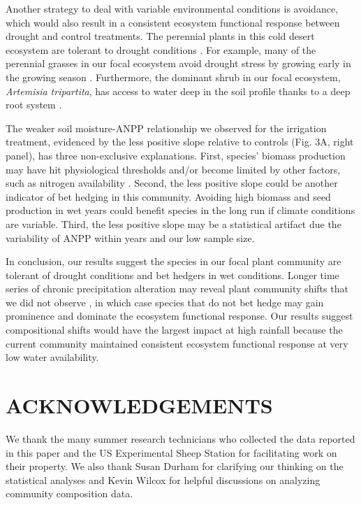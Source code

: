 \documentclass[fleqn,10pt,lineno]{wlpeerj} %
\begin{document}
Another strategy to deal with variable environmental conditions is
avoidance, which would also result in a consistent ecosystem functional
response between drought and control treatments. The perennial plants in
this cold desert ecosystem are tolerant to drought conditions
\citep[A.R. Kleinhesselink, unpublished data]{Bazzaz1979, Franks2011}.
For example, many of the perennial grasses in our focal ecosystem avoid
drought stress by growing early in the growing season \citep[A.R.
Kleinhesselink, personal observation]{Blaisdell1958}. Furthermore, the
dominant shrub in our focal ecosystem, \emph{Artemisia tripartita}, has
access to water deep in the soil profile thanks to a deep root system
\citep{Kulmatiski2017a}.

The weaker soil moisture-ANPP relationship we observed for the
irrigation treatment, evidenced by the less positive slope relative to
controls (Fig. 3A, right panel), has three non-exclusive explanations.
First, species' biomass production may have hit physiological thresholds
and/or become limited by other factors, such as nitrogen availability
\citep{LeBauer2008}.
Second, the less positive slope could be another indicator of bet
hedging in this community. Avoiding high biomass and seed production in
wet years could benefit species in the long run if climate conditions
are variable. Third, the less positive slope may be a statistical
artifact due the variability of ANPP within years and our low sample
size.

In conclusion, our results suggest the species in our focal plant
community are tolerant of drought conditions and bet hedgers in wet
conditions. Longer time series of chronic precipitation alteration may
reveal plant community shifts that we did not observe
\citep[e.g.,][]{Wilcox2016}, in which case species that do not bet hedge
may gain prominence and dominate the ecosystem functional response. Our
results suggest compositional shifts would have the largest impact at
high rainfall because the current community maintained consistent
ecosystem functional response at very low water availability.

\section{ACKNOWLEDGEMENTS}\label{acknowledgements}

We thank the many summer research technicians who collected the data
reported in this paper and the US Experimental Sheep Station for
facilitating work on their property. We also thank Susan Durham for
clarifying our thinking on the statistical analyses and Kevin Wilcox for
helpful discussions on analyzing community composition data.
\end{document}
